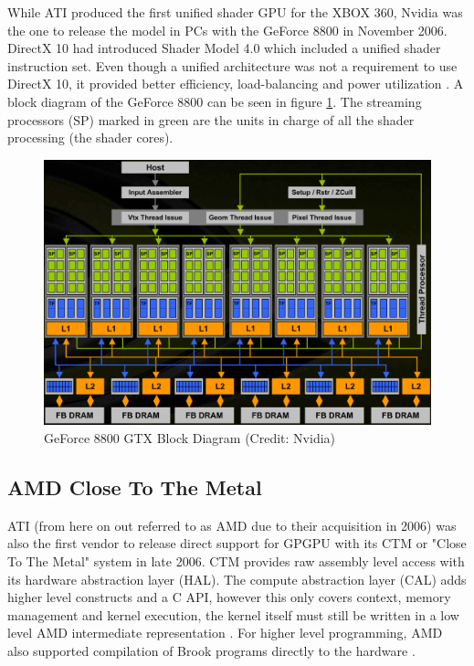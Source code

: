 While ATI produced the first unified shader GPU for the XBOX 360, Nvidia was the one  to release the model in PCs with the GeForce 8800 in November 2006. DirectX 10 had introduced Shader Model 4.0 which included a unified shader instruction set. Even though a unified architecture was not a requirement to use DirectX 10, it provided better efficiency, load-balancing and power utilization \cite{geforce_8800_architecture}. A block diagram of the GeForce 8800 can be seen in figure \ref{fig:8800-arch}. The streaming processors (SP) marked in green are the units in charge of all the shader processing (the shader cores).

\begin{figure}[ht]
    \centering
    \includegraphics[width=\textwidth]{img/geforce-8800-block-diagram.png}
    \captionsetup{justification=centering}
    \caption{GeForce 8800 GTX Block Diagram (Credit: Nvidia)}
    \label{fig:8800-arch}
\end{figure}

\subsection{AMD Close To The Metal}

ATI (from here on out referred to as AMD due to their acquisition in 2006) was also the first vendor to release direct support for GPGPU with its CTM or "Close To The Metal" system in late 2006. CTM provides raw assembly level access with its hardware abstraction layer (HAL). The compute abstraction layer (CAL) adds higher level constructs and a C API, however this only covers context, memory management and kernel execution, the kernel itself must still be written in a low level AMD intermediate representation \cite{amd_ctm_programming_guide}. For higher level programming, AMD also supported compilation of Brook programs directly to the hardware \cite{gpu_computing}.

